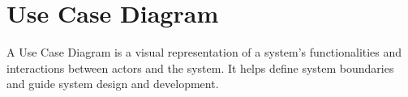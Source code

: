 \section{Use Case Diagram}
A Use Case Diagram is a visual representation of a system's functionalities and interactions between actors and the system. It helps define system boundaries and guide system design and development.


